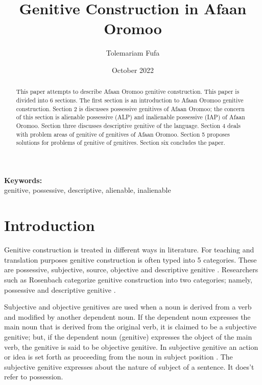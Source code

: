 \documentclass[11pt,a4paper]{article}
\title {Genitive Construction in Afaan Oromoo}
\author {Tolemariam Fufa}
\date{October 2022}
\begin{document}
	\newcommand\keywords[1]{%
		\begingroup
		\let\and\\
		\par
		\noindent\textbf{Keywords:}\\#1\par
		\endgroup
	}
	\maketitle
	\begin{abstract}
		 
		This paper attempts to describe Afaan Oromoo genitive construction.	This paper is divided into 6 sections. The first section is an introduction to Afaan Oromoo genitive construction. Section 2 is discusses possessive genitives of Afaan Oromoo; the concern of this section is alienable possessive (ALP) and inalienable possessive (IAP) of Afaan Oromoo. Section three discusses descriptive genitive of the language. Section 4 deals with problem areas of genitive of genitives of Afaan Oromoo. Section 5 proposes solutions for problems of genitive of genitives. Section six concludes the paper.
	\end{abstract}
	\keywords{genitive, possessive, descriptive, alienable, inalienable}
	\newpage
	
	\section{Introduction}
	\label{sec:org462cb4a}
	
	Genitive construction is treated in different ways in literature. For teaching and translation purposes genitive construction is often typed into 5 categories. These are possessive, subjective, source, objective and descriptive genitive \cite{ELTcon}. Researchers such as Rosenbach categorize genitive construction into two categories; namely, possessive and descriptive genitive \cite{rosenbach2006descriptive,gebregziabher2012alienable}. 
	
	
	Subjective and objective genitives are used when a noun is derived from a verb and modified by another dependent noun. If the dependent noun expresses the main noun that is derived from the original verb, it is claimed to be a subjective genitive; but, if the dependent noun (genitive) expresses the object of the main verb, the genitive is said to be objective genitive. In subjective genitive an action or idea is set forth as proceeding from the noun in subject position \cite[68]{greenlee1950genitive}. The subjective genitive expresses about the nature of subject of a sentence. It does’t refer to possession. 
	
\end{document}
